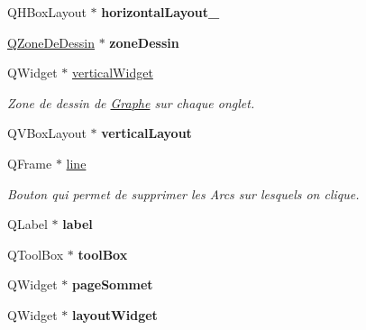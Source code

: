 \begin{DoxyCompactItemize}
Q\+H\+Box\+Layout $\ast$ {\bfseries horizontal\+Layout\+\_}
\item 
\mbox{\label{classUi__MainWindow_a66eaa6dd228ffc606c5bb235e497bbd7}} 
\hyperlink{classQZoneDeDessin}{Q\+Zone\+De\+Dessin} $\ast$ {\bfseries zone\+Dessin}
\item 
\mbox{\label{classUi__MainWindow_a0e17a6c02b6ff387e551480be5c3eccb}} 
Q\+Widget $\ast$ \hyperlink{classUi__MainWindow_a0e17a6c02b6ff387e551480be5c3eccb}{vertical\+Widget}
\begin{DoxyCompactList}\small\item\em Zone de dessin de \hyperlink{classGraphe}{Graphe} sur chaque onglet. \end{DoxyCompactList}\item 
\mbox{\label{classUi__MainWindow_a649287f742c9a33b8444116dccb1b72b}} 
Q\+V\+Box\+Layout $\ast$ {\bfseries vertical\+Layout}
\item 
\mbox{\label{classUi__MainWindow_a249d59b1188cc69f7e0290da15019085}} 
Q\+Frame $\ast$ \hyperlink{classUi__MainWindow_a249d59b1188cc69f7e0290da15019085}{line}
\begin{DoxyCompactList}\small\item\em Bouton qui permet de supprimer les Arcs sur lesquels on clique. \end{DoxyCompactList}\item 
\mbox{\label{classUi__MainWindow_a78edcdd12ea78c06d7e80f322c8882f9}} 
Q\+Label $\ast$ {\bfseries label}
\item 
\mbox{\label{classUi__MainWindow_a208f5ea208413783f99123d83f6268ca}} 
Q\+Tool\+Box $\ast$ {\bfseries tool\+Box}
\item 
\mbox{\label{classUi__MainWindow_a596551d6deea0069c999b59782c4cd6c}} 
Q\+Widget $\ast$ {\bfseries page\+Sommet}
\item 
\mbox{\label{classUi__MainWindow_a6356443dc067ef5164e2f4dc834e640b}} 
Q\+Widget $\ast$ {\bfseries layout\+Widget}
\item 
\mbox{\label{classUi__MainWindow_ac4586abe48f0aabf940b0dc2df3772ed}} 

\end{DoxyCompactItemize}
